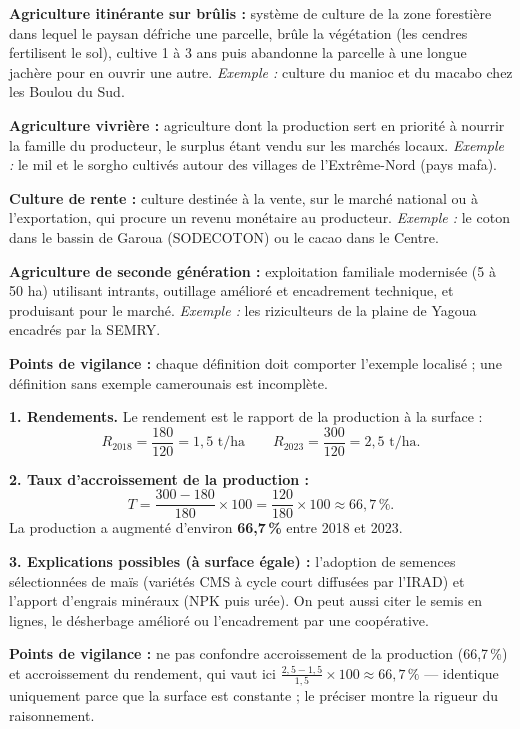 \documentclass[11pt]{article}
\begin{document}
\begin{corrige}
\textbf{Agriculture itinérante sur brûlis :} système de culture de la zone forestière dans lequel le paysan défriche une parcelle, brûle la végétation (les cendres fertilisent le sol), cultive 1 à 3 ans puis abandonne la parcelle à une longue jachère pour en ouvrir une autre. \emph{Exemple :} culture du manioc et du macabo chez les Boulou du Sud.

\textbf{Agriculture vivrière :} agriculture dont la production sert en priorité à nourrir la famille du producteur, le surplus étant vendu sur les marchés locaux. \emph{Exemple :} le mil et le sorgho cultivés autour des villages de l'Extrême-Nord (pays mafa).

\textbf{Culture de rente :} culture destinée à la vente, sur le marché national ou à l'exportation, qui procure un revenu monétaire au producteur. \emph{Exemple :} le coton dans le bassin de Garoua (SODECOTON) ou le cacao dans le Centre.

\textbf{Agriculture de seconde génération :} exploitation familiale modernisée (5 à 50 ha) utilisant intrants, outillage amélioré et encadrement technique, et produisant pour le marché. \emph{Exemple :} les riziculteurs de la plaine de Yagoua encadrés par la SEMRY.

\textbf{Points de vigilance :} chaque définition doit comporter l'exemple localisé ; une définition sans exemple camerounais est incomplète.
\end{corrige}

\begin{corrige}
\textbf{1. Rendements.} Le rendement est le rapport de la production à la surface :
\[ R_{2018} = \frac{180}{120} = 1{,}5 \text{ t/ha} \qquad R_{2023} = \frac{300}{120} = 2{,}5 \text{ t/ha}. \]

\textbf{2. Taux d'accroissement de la production :}
\[ T = \frac{300 - 180}{180} \times 100 = \frac{120}{180} \times 100 \approx 66{,}7\,\%. \]
La production a augmenté d'environ \textbf{66,7\,\%} entre 2018 et 2023.

\textbf{3. Explications possibles (à surface égale) :} l'adoption de semences sélectionnées de maïs (variétés CMS à cycle court diffusées par l'IRAD) et l'apport d'engrais minéraux (NPK puis urée). On peut aussi citer le semis en lignes, le désherbage amélioré ou l'encadrement par une coopérative.

\textbf{Points de vigilance :} ne pas confondre accroissement de la production (66,7\,\%) et accroissement du rendement, qui vaut ici $\frac{2{,}5-1{,}5}{1{,}5}\times 100 \approx 66{,}7\,\%$ — identique uniquement parce que la surface est constante ; le préciser montre la rigueur du raisonnement.
\end{corrige}
\end{document}
